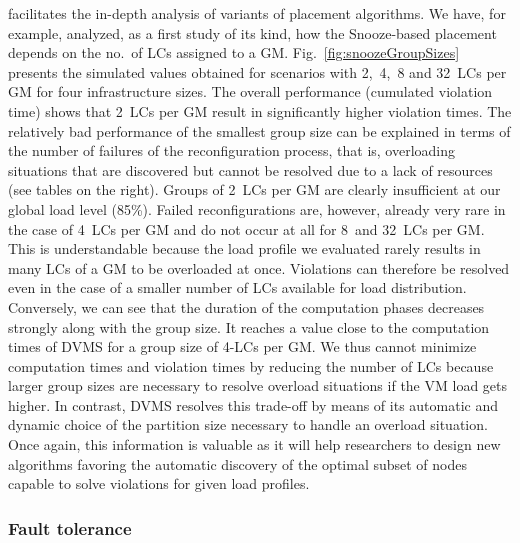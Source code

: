 \vmps facilitates the in-depth analysis of variants of placement
algorithms. We have, for example, analyzed, as a first study of its
kind, how the Snooze-based placement depends on the no.\ of LCs
assigned to a GM. Fig.~\ref{fig:snoozeGroupSizes} presents the
simulated values obtained for scenarios with 2,~4,~8 and 32~LCs per GM
for four infrastructure sizes. The overall performance (\ie cumulated
violation time) shows that 2~LCs per GM result in significantly higher
violation times.
The relatively bad performance of the smallest group size can be
explained in terms of the number of failures of the reconfiguration
process, that is, overloading situations that are discovered but
cannot be resolved
due to a lack of resources (see tables on the right).  Groups of 2~LCs
per GM are clearly insufficient at our global load level (85\%).
Failed reconfigurations are, however, already very rare in the case of
4~LCs per GM and do not occur at all for 8~and 32~LCs per GM. This is
understandable because
the load profile we evaluated rarely results in many LCs of a GM to be
overloaded at once. Violations can therefore be resolved even in the
case of a smaller number of LCs available for load distribution.
Conversely, we can see that the duration of the computation phases
decreases strongly along with the group size. It reaches a value close
to the computation times of DVMS for a group size of 4-LCs per
GM.%
We thus cannot minimize computation times and violation times by
reducing the number of LCs because larger group sizes are necessary to
resolve overload situations if the VM load gets higher.  In contrast,
DVMS resolves this trade-off by means of its automatic and dynamic
choice of the partition size necessary to handle an overload
situation.  Once again, this information is valuable as it will help
researchers to design new algorithms favoring the automatic discovery
of the optimal subset of nodes capable to solve violations for given
load profiles.


\subsubsection{Fault tolerance} 

